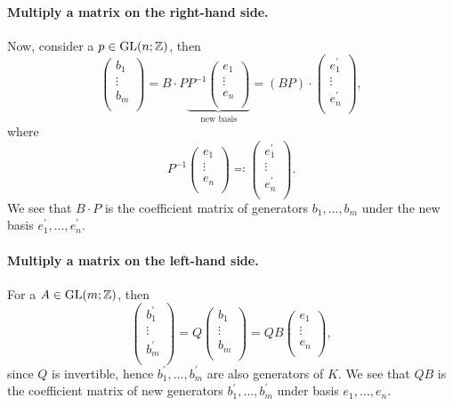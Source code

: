 \paragraph{Multiply a matrix on the right-hand side.} Now, consider a \(p\in \mathrm{GL}(n; \mathbb{\MakeUppercase{z}} ) \), then
\[
	\begin{pmatrix}
		b_1    \\
		\vdots \\
		b_{m}  \\
	\end{pmatrix} = B \cdot P \underbrace{P^{-1} \begin{pmatrix}
			e_{1}  \\
			\vdots \\
			e_{n}  \\
		\end{pmatrix}}_{\text{new basis} } = (BP)\cdot \begin{pmatrix}
		e_{1}^\prime \\
		\vdots       \\
		e_{n}^\prime \\
	\end{pmatrix},
\]
where
\[
	P^{-1} \begin{pmatrix}
		e_{1}  \\
		\vdots \\
		e_{n}  \\
	\end{pmatrix} \eqqcolon \begin{pmatrix}
		e_{1}^\prime \\
		\vdots       \\
		e_{n}^\prime \\
	\end{pmatrix}.
\]
We see that \(B\cdot P\) is the coefficient matrix of generators \(b_{1}, \ldots , b_{m}   \) under the new basis \(e_1^\prime , \ldots , e_{n} ^\prime  \).

\paragraph{Multiply a matrix on the left-hand side.} For a \(A\in \mathrm{GL}(m; \mathbb{\MakeUppercase{z}} ) \), then
\[
	\begin{pmatrix}
		b_1^\prime \\
		\vdots     \\
		b_m^\prime \\
	\end{pmatrix} = Q \begin{pmatrix}
		b_1    \\
		\vdots \\
		b_m    \\
	\end{pmatrix} = QB\begin{pmatrix}
		e_{1}  \\
		\vdots \\
		e_{n}  \\
	\end{pmatrix},
\]
since \(Q\) is invertible, hence \(b_1^\prime , \ldots , b_{m} ^\prime\) are also generators of \(K\). We see that \(QB\) is the coefficient matrix of new generators
\(b_1^\prime , \ldots , b_{m} ^\prime  \) under basis \(e_1, \ldots , e_{n}  \).

